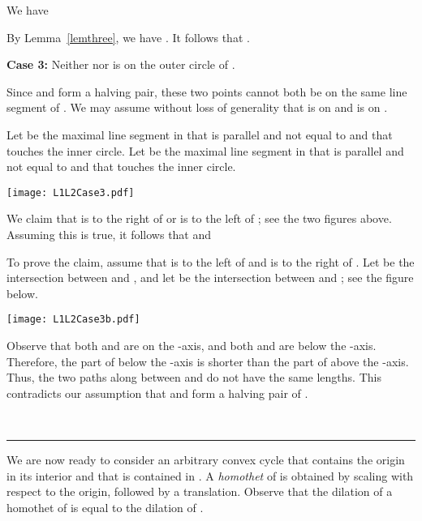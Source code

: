 \documentclass[12pt]{article}
\newcommand{\qed}{\rule{0.5em}{1.5ex}}
\newcommand{\fqed}{{\hfill~\qed}}
\newenvironment{proof}{{\noindent \bf Proof.}}
                      {{\hfill \fqed} \vspace{1em}}
\begin{document}
\begin{proof}
We have 
 
By Lemma~\ref{lemthree}, we have . 
It follows that . 

\vspace{0.5em} 

\noindent 
{\bf Case 3:} Neither  nor  is on the outer circle of . 

Since  and  form a halving pair, these two points cannot both be 
on the same line segment of . We may assume without loss of 
generality that  is on  and  is on . 

Let  be the maximal line segment in  that is parallel 
and not equal to  and that touches the inner circle.  
Let  be the maximal line segment in  that is parallel 
and not equal to  and that touches the inner circle.  

\begin{center}
   \texttt{[image: L1L2Case3.pdf]}
\end{center}

We claim that  is to the right of  or  is to the left of 
; see the two figures above. Assuming this is true, it follows 
that  and 
  
To prove the claim, assume that  is to the left of  and  is 
to the right of . Let  be the intersection between  and 
, and let  be the intersection between  and ; see 
the figure below. 

\begin{center}
   \texttt{[image: L1L2Case3b.pdf]}
\end{center}

Observe that both  and  are on the -axis, and both  and  
are below the -axis. Therefore, the part of  below the -axis is 
shorter than the part of  above the -axis. Thus, the two paths 
along  between  and  do not have the same lengths. This  
contradicts our assumption that  and  form a halving pair of 
.     
\end{proof}  

We are now ready to consider an arbitrary convex cycle  that contains 
the origin in its interior and that is contained in . 
A \emph{homothet} of  is obtained by scaling  with respect to the 
origin, followed by a translation. Observe that the dilation of a 
homothet of  is equal to the dilation of . 
\end{document}
